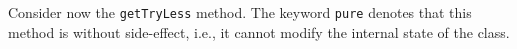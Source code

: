 Consider now the \texttt{getTryLess} method. The
keyword \texttt{pure} denotes that this method is without side-effect, i.e.,
it cannot modify the internal state of the class. %







 
